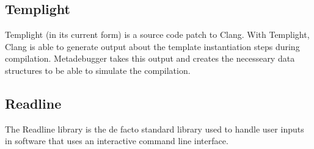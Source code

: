\subsection{Templight\cite{templight}}

Templight (in its current form) is a source code patch to Clang. With
Templight, Clang is able to generate output about the template instantiation
steps during compilation. Metadebugger takes this output and creates the
necesseary data structures to be able to simulate the compilation.

\subsection{Readline\cite{readline}}

The Readline library is the de facto standard library used to handle user
inputs in software that uses an interactive command line interface.


